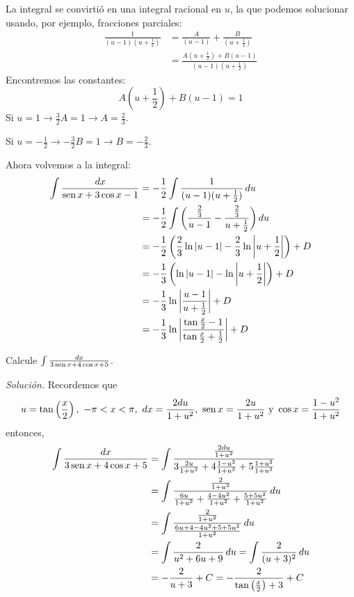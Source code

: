 La integral se convirtió en una integral racional en $u$, la que podemos solucionar usando, por ejemplo, fracciones parciales:
\begin{align*}
  \frac{1}{(u-1)(u+\frac{1}{2})}&=\frac{A}{(u-1)}+\frac{B}{(u+\frac{1}{2})}\\
  &=\frac{A(u+\frac{1}{2})+B(u-1)}{(u-1)(u+\frac{1}{2})}
\end{align*}
Encontremos las constantes:
\[
  A\left(u+\frac{1}{2}\right)+B(u-1)=1
\]
Si $u=1\rightarrow \frac{3}{2}A=1\rightarrow A=\frac{2}{3}$.

Si $u=-\frac{1}{2}\rightarrow -\frac{3}{2}B=1\rightarrow B=-\frac{2}{3}$.

Ahora volvemos a la integral:
\begin{align*}
  \int \frac{dx}{\operatorname{sen} x+3\cos x-1}&=-\frac{1}{2}\int \frac{1}{(u-1)(u+\frac{1}{2})}\, du\\
  &=-\frac{1}{2}\int \left(\frac{\frac{2}{3}}{u-1}-\frac{\frac{2}{3}}{u+\frac{1}{2}}\right )du \\
  &=-\frac{1}{2}\left(\frac{2}{3}\ln |u-1|-\frac{2}{3}\ln \left|u+\frac{1}{2}\right|\right)+D \\
  &=-\frac{1}{3}\left(\ln |u-1|-\ln \left|u+\frac{1}{2}\right|\right)+D\\
  &=-\frac{1}{3}\ln \left|\frac{u-1}{u+\frac{1}{2}}\right|+D\\
  &=-\frac{1}{3}\ln \left|\frac{\tan \frac{x}{2}-1}{\tan \frac{x}{2}+\frac{1}{2}}\right|+D
\end{align*}

\begin{ejemplo}
  Calcule $\int \frac{dx}{3\operatorname{sen} x+4\cos x+5}$.
\end{ejemplo}

\emph{Solución.} Recordemos que
\begin{gather*}
  u=\tan \left( \frac{x}{2}\right),\ -\pi<x<\pi,\ dx=\frac{2du}{1+u^{2}},\ \sen x=\frac{2u}{1+u^{2}}\text{ y }\cos x=\frac{1-u^{2}}{1+u^{2}}
\end{gather*}
entonces,
\begin{align*}
  \int \frac{dx}{3\operatorname{sen} x+4\cos x+5}
  &= \int \frac{\frac{2du}{1+u^{2}}}{3\frac{2u}{1+u^{2}} + 4\frac{1-u^{2}}{1+u^{2}} + 5\frac{1+u^{2}}{1+u^{2}}} \\
  &= \int \frac{\frac{2}{1+u^{2}}}{\frac{6u}{1+u^{2}} + \frac{4-4u^{2}}{1+u^{2}} + \frac{5+5u^{2}}{1+u^{2}}} \, du \\
  &= \int \frac{\frac{2}{1+u^{2}}}{\frac{6u+4-4u^{2}+5+5u^{2}}{1+u^{2}}} \, du\\
  &= \int \frac{2}{u^{2}+6u+9} \, du
  = \int \frac{2}{(u+3)^{2}} \, du \\
  &= -\frac{2}{u+3} + C= -\frac{2}{\tan\left(\frac{x}{2}\right)+3} + C
\end{align*}

